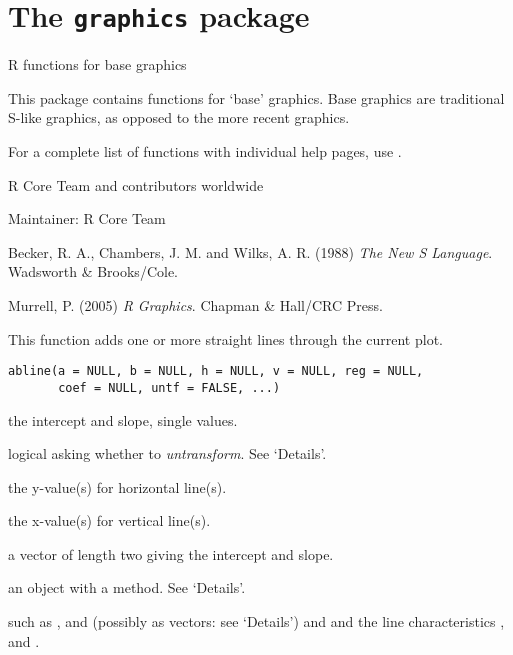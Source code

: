 
\chapter{The \texttt{graphics} package}
%
\begin{Description}\relax
R functions for base graphics
\end{Description}
%
\begin{Details}\relax
This package contains functions for `base' graphics.  Base graphics
are traditional S-like graphics, as opposed to the more recent
 graphics. 

For a complete list of functions with individual help pages,
use .
\end{Details}
%
\begin{Author}\relax
R Core Team and contributors worldwide

Maintainer: R Core Team 
\end{Author}
%
\begin{References}\relax
Becker, R. A., Chambers, J. M. and Wilks, A. R. (1988)
\emph{The New S Language}.
Wadsworth \& Brooks/Cole.

Murrell, P. (2005) \emph{R Graphics}. Chapman \& Hall/CRC Press.
\end{References}
%
\begin{Description}\relax
This function adds one or more straight lines through the current plot.
\end{Description}
%
\begin{Usage}
\begin{verbatim}
abline(a = NULL, b = NULL, h = NULL, v = NULL, reg = NULL,
       coef = NULL, untf = FALSE, ...)
\end{verbatim}
\end{Usage}
%
\begin{Arguments}
\begin{ldescription}
\item[\code{a, b}] the intercept and slope, single values.
\item[\code{untf}] logical asking whether to \emph{untransform}.  See
`Details'.
\item[\code{h}] the y-value(s) for horizontal line(s).
\item[\code{v}] the x-value(s) for vertical line(s).
\item[\code{coef}] a vector of length two giving the intercept and slope.
\item[\code{reg}] an object with a  method.  See `Details'.
\item[\code{...}]  such as
,  and   (possibly as vectors: see
`Details') and  and the line characteristics
,  and .
\end{ldescription}
\end{Arguments}
